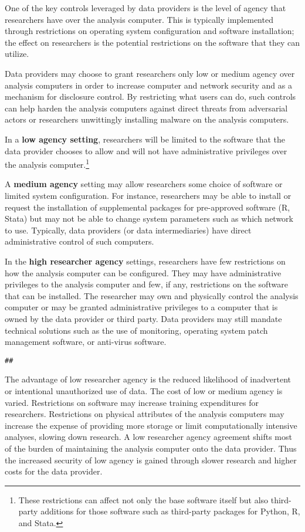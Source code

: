 One of the key controls leveraged by data providers is the level of agency that researchers have over the analysis computer. This is typically implemented through restrictions on operating system configuration and software installation; the effect on researchers is the potential restrictions on the software that they can utilize.

Data providers may choose to grant researchers only low or medium agency over analysis computers in order to increase computer and network security and as a mechanism for disclosure control. By restricting what users can do, such controls can help harden the analysis computers against direct threats from adversarial actors or researchers unwittingly installing malware on the analysis computers.

In a \textbf{low agency setting}, researchers will be limited to the software that the data provider chooses to allow and will not have administrative privileges over the analysis computer.\footnote{These restrictions can affect not only the base software itself but also third-party additions for those software such as third-party packages for Python, R, and Stata.}

A \textbf{medium agency} setting may allow researchers some choice of software or limited system configuration. For instance, researchers may be able to install or request the installation of supplemental packages for pre-approved software (R, Stata) but may not be able to change system parameters such as which network to use. Typically, data providers (or data intermediaries) have direct administrative control of such computers.

In the \textbf{high researcher agency} settings, researchers have few restrictions on how the analysis computer can be configured. They may have administrative privileges to the analysis computer and few, if any, restrictions on the software that can be installed. The researcher may own and physically control the analysis computer or may be granted administrative privileges to a computer that is owned by the data provider or third party. Data providers may still mandate technical solutions such as the use of monitoring, operating system patch management software, or anti-virus software.

\begin{verbatim}
## 
\end{verbatim}

The advantage of low researcher agency is the reduced likelihood of inadvertent or intentional unauthorized use of data. The cost of low or medium agency is varied. Restrictions on software may increase training expenditures for researchers. Restrictions on physical attributes of the analysis computers may increase the expense of providing more storage or limit computationally intensive analyses, slowing down research. A low researcher agency agreement shifts most of the burden of maintaining the analysis computer onto the data provider. Thus the increased security of low agency is gained through slower research and higher costs for the data provider.

